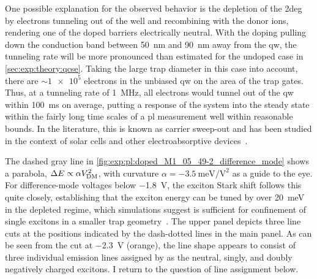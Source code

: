 One possible explanation for the observed behavior is the depletion of the \gls{2deg} by electrons tunneling out of the well and recombining with the donor ions, rendering one of the doped barriers electrically neutral.
With the doping pulling down the conduction band between \qty{50}{\nano\meter} and \qty{90}{\nano\meter} away from the \gls{qw}, the tunneling rate will be more pronounced than estimated for the undoped case in \cref{sec:exp:theory:qcse}.
Taking the large trap diameter in this case into account, there are $\sim\num{1e5}$ electrons in the unbiased \gls{qw} on the area of the trap gates.
Thus, at a tunneling rate of \qty{1}{\mega\hertz}, all electrons would tunnel out of the \gls{qw} within \qty{100}{\milli\second} on average, putting a response of the system into the steady state within the fairly long time scales of a \gls{pl} measurement
well within reasonable bounds.
In the literature, this is known as carrier sweep-out and has been studied in the context of solar cells and other electroabsorptive devices~\cite{Larsson1988,Schneider1988,Fox1991}.

The dashed gray line in \cref{fig:exp:pl:doped_M1_05_49-2_difference_mode} shows a parabola, $\Delta E\propto \alpha V_{\mathrm{DM}}^2$, with curvature $\alpha = \qty{-3.5}{\milli\electronvolt\per\volt\squared}$ as a guide to the eye.
For difference-mode voltages below \qty{-1.8}{\volt}, the exciton Stark shift follows this quite closely, establishing that the exciton energy can be tuned by over \qty{20}{\milli\electronvolt} in the depleted regime, which simulations suggest is sufficient for confinement of single excitons in a smaller trap geometry~\cite{Descamps2021}.
The upper panel depicts three line cuts at the positions indicated by the dash-dotted lines in the main panel.
As can be seen from the cut at \qty{-2.3}{\volt} (orange), the line shape appears to consist of three individual emission lines assigned by \citet{Descamps2021} as the neutral, singly, and doubly negatively charged excitons. %
I return to the question of line assignment below.

